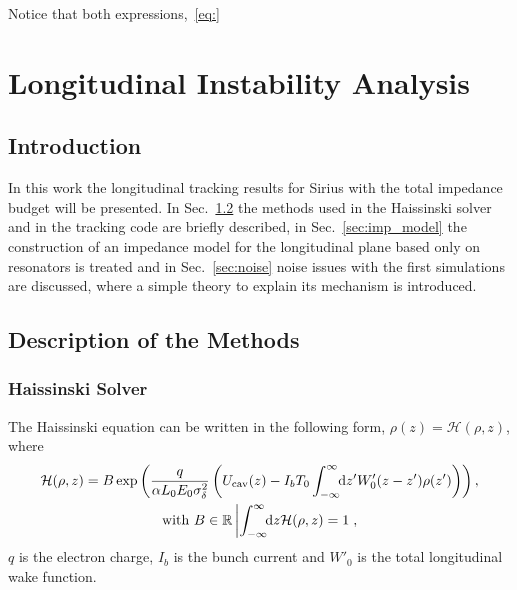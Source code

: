 \begin{apendicesenv}
    Notice that both expressions,~\eqref{eq:}


\chapter{Longitudinal Instability Analysis}

\section{Introduction}

    In this work the longitudinal tracking results for Sirius with the total impedance budget will be presented. In Sec.~\ref{sec:description} the methods used in the Haissinski solver and in the tracking code are briefly described, in Sec.~\ref{sec:imp_model} the construction of an impedance model for the longitudinal plane based only on resonators is treated and in Sec.~\ref{sec:noise} noise issues with the first simulations are discussed, where a simple theory to explain its mechanism is introduced.

\section{Description of the Methods}\label{sec:description}

\subsection{Haissinski Solver}
    The Haissinski equation can be written in the following form, $\rho(z) = \mathcal{H}(\rho,z)$, where
    \begin{gather}\nonumber
        \mathcal{H}(\rho,z) = B\exp\left(\frac{q}{\alpha L_0 E_0 \sigma_\delta^2}\left(U_\text{cav}(z)-I_b T_0\int_{-\infty}^{\infty}\!\!\text{d}z' W'_0(z-z')\rho(z')\right)\right),\\
        \text{with}\,\,B \in \mathbb{R} \left| \int_{-\infty}^{\infty}\!\!\text{d}z \mathcal{H}(\rho,z)=1\right.,
    \end{gather}
    $q$ is the electron charge, $I_b$ is the bunch current and $W'_0$ is the total longitudinal wake function.


\end{apendicesenv}
